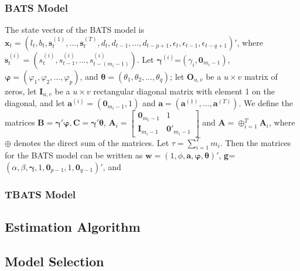 \documentclass{uwstat572}
\begin{document}
\subsubsection{BATS Model}
The state vector of the BATS model is $\textbf{x}_t=(l_t,b_t,\textbf{s}_t^{(1)},...,\textbf{s}_t^{(T)}, d_t, d_{t-1},..., d_{t-p+1}, \epsilon_t, \epsilon_{t-1}, \epsilon_{t-q+1} )'$, 
where $\textbf{s}_t^{(i)}=(s_t^{(i)}, s_{t-1}^{(i)} ,..., s_{t-(m_i-1)}^{(i)}  )$. Let $\bm{\gamma}^{(i)}$=$(\gamma_i, \textbf{0}_{m_i-1})$, $\bm{\varphi}=(\varphi_1, \varphi_2,..., \varphi_p)$, and $\bm{\theta}=(\theta_1,\theta_2,...,\theta_q)$; let $\textbf{O}_{u,v}$ be a $u \times v$ matrix of zeros, let $\textbf{I}_{u,v}$ be a $u \times v$ rectangular diagonal matrix with element 1 on the diagonal, and let $\textbf{a}^{(i)}=(\textbf{0}_{m_i-1},1)$ and $\textbf{a}=(\textbf{a}^{(1)},...,\textbf{a}^{(T)})$. We define the matrices $\textbf{B}=\bm{\gamma}'\bm{\varphi}, \textbf{C}=\bm{\gamma}'\bm{\theta}$, $\textbf{A}_i=\begin{bmatrix} 
\textbf{0}_{m_i-1} &1 \\ 
\textbf{I}_{m_i-1} & \textbf{0}'_{m_i-1} 
\end{bmatrix}$ and $\textbf{A}=\oplus _{i=1}^T \textbf{A}_i$, where $\oplus$ denotes the direct sum of the matrices. Let $\tau=\sum_{i=1}^{T} m_i$. Then the matrices for the BATS model can be written as $\textbf{w}=(1,\phi,\textbf{a}, \bm{\varphi}, \bm{\theta})'$, \textbf{g}=$(\alpha,\beta,\bm{\gamma}, 1, \textbf{0}_{p-1}, 1, \textbf{0}_{q-1})'$, and 


\subsubsection{TBATS Model}


\subsection{Estimation Algorithm}

\subsection{Model Selection}
\label{sec:selection}

\nocite{*}


\end{document}

